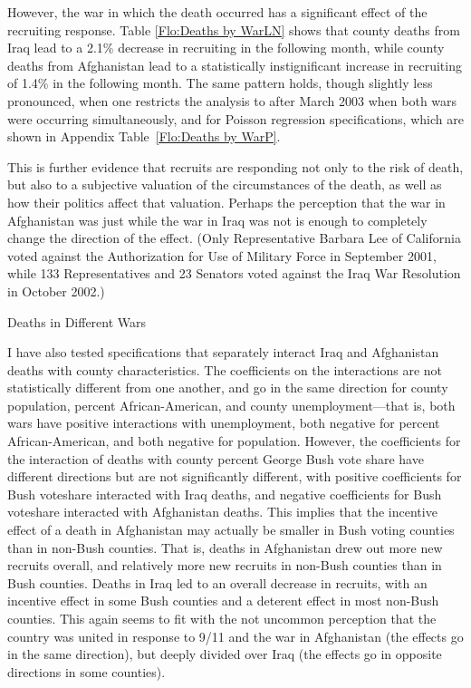 \documentclass[12pt] {article}
\begin{document}
However, the war in which the death occurred has a significant effect of the recruiting response. Table \ref{Flo:Deaths by WarLN} shows that county deaths from Iraq lead to a 2.1\% decrease in recruiting in the following month, while county deaths from Afghanistan lead to a statistically instignificant increase in recruiting of 1.4\% in the following month. The same pattern holds, though slightly less pronounced, when one restricts the analysis to after March 2003 when both wars were occurring simultaneously, and for Poisson regression specifications, which are shown in Appendix Table~\ref{Flo:Deaths by WarP}. 

This is further evidence that recruits are responding not only to the risk of death, but also to a subjective valuation of the circumstances of the death, as well as how their politics affect that valuation. Perhaps the perception that the war in Afghanistan was just while the war in Iraq was not is enough to completely change the direction of the effect. (Only Representative Barbara Lee of California voted against the Authorization for Use of Military Force in September 2001, while 133 Representatives and 23 Senators voted against the Iraq War Resolution in October 2002.)
\begin{table}
\caption{Deaths in Different Wars}
\label{Flo:Deaths by WarLN}
\scalebox{0.8}{

}
\end{table}


I have also tested specifications that separately interact Iraq and Afghanistan deaths with county characteristics. The coefficients on the interactions are not statistically different from one another, and go in the same direction for county population, percent African-American, and county unemployment---that is, both wars have positive interactions with unemployment, both negative for percent African-American, and both negative for population. However, the coefficients for the interaction of deaths with county percent George Bush vote share have different directions but are not significantly different, with positive coefficients for Bush voteshare interacted with Iraq deaths, and negative coefficients for Bush voteshare interacted with Afghanistan deaths. This implies that the incentive effect of a death in Afghanistan may actually be smaller in Bush voting counties than in non-Bush counties. That is, deaths in Afghanistan drew out more new recruits overall, and relatively more new recruits in non-Bush counties than in Bush counties. Deaths in Iraq led to an overall decrease in recruits, with an incentive effect in some Bush counties and a deterent effect in most non-Bush counties. This again seems to fit with the not uncommon perception that the country was united in response to 9/11 and the war in Afghanistan (the effects go in the same direction), but deeply divided over Iraq (the effects go in opposite directions in some counties). 
\end{document}
